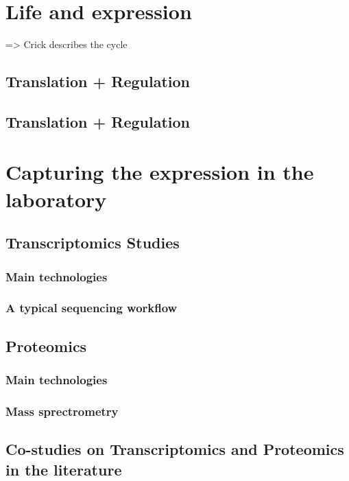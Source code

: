 \section{Life and expression}

 => Crick describes the cycle


\subsection{Translation + Regulation}

\subsection{Translation + Regulation}



\section{Capturing the expression in the laboratory}
\subsection{Transcriptomics Studies}
    \subsubsection{Main technologies}
    \subsubsection{A typical sequencing workflow}
\subsection{Proteomics}
    \subsubsection{Main technologies}
    \subsubsection{Mass sprectrometry}
\subsection{Co-studies on Transcriptomics and Proteomics in the literature}

